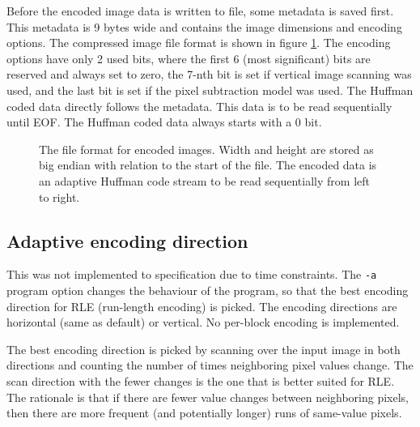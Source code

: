 \documentclass[pdftex, 11pt, a4paper, titlepage]{article}
\newcommand{\code}{\texttt}
\begin{document}
    Before the encoded image data is written to file, some metadata is saved first. This metadata
    is 9 bytes wide and contains the image dimensions and encoding options. The compressed image file format
    is shown in figure \ref{fig:encoded_format}. The encoding options have only 2 used bits, where the first
    6 (most significant) bits are reserved and always set to zero, the 7-nth bit is set if vertical image scanning
    was used, and the last bit is set if the pixel subtraction model was used. The Huffman coded data directly
    follows the metadata. This data is to be read sequentially until EOF. The Huffman coded data always
    starts with a 0 bit.
    \begin{figure}[h]
        \begin{alltt}
        \end{alltt}
        \caption{The file  format for encoded images. Width and height are stored
        as big endian with relation to the start of the file. The encoded data is an adaptive Huffman code
        stream to be read sequentially from left to right.}
        \label{fig:encoded_format}
    \end{figure}

    \subsection{Adaptive encoding direction} \label{sec:adaptive_scan}
    This was not implemented to specification due to time constraints. The \code{-a} program option
    changes the behaviour of the program, so that the best encoding direction for RLE (run-length encoding)
    is picked. The encoding directions are horizontal (same as default) or vertical. No per-block encoding
    is implemented.

    The best encoding direction is picked by scanning over the input image in both directions and counting
    the number of times neighboring pixel values change. The scan direction with the fewer changes is the
    one that is better suited for RLE. The rationale is that if there are fewer value changes between
    neighboring pixels, then there are more frequent (and potentially longer) runs of same-value pixels.
\end{document}
